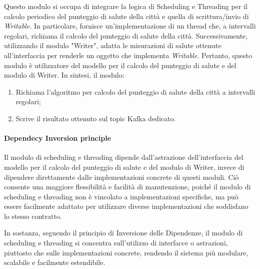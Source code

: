 Questo modulo si occupa di integrare la logica di Scheduling e Threading per il calcolo periodico del punteggio di salute della città e quella di scrittura/invio di \textit{Writable}. In particolare, fornisce un'implementazione di un thread che, a intervalli regolari, richiama il calcolo del punteggio di salute della città. Successivamente, utilizzando il modulo "Writer", adatta le misurazioni di salute ottenute all'interfaccia per renderle un oggetto che implementa \textit{Writable}. Pertanto, questo modulo è utilizzatore del modello per il calcolo del punteggio di salute e del modulo di Writer.
In sintesi, il modulo:
    \begin{enumerate}
        \item Richiama l'algoritmo per calcolo del punteggio di salute della città a intervalli regolari;
        \item Scrive il risultato ottenuto sul topic Kafka dedicato.
    \end{enumerate}

\paragraph*{Dependecy Inversion principle}
Il modulo di scheduling e threading dipende dall'astrazione dell'interfaccia del modello per il calcolo del punteggio di salute e del modulo di Writer, invece di dipendere direttamente dalle implementazioni concrete di questi moduli. Ciò consente una maggiore flessibilità e facilità di manutenzione, poiché il modulo di scheduling e threading non è vincolato a implementazioni specifiche, ma può essere facilmente adattato per utilizzare diverse implementazioni che soddisfano lo stesso contratto.

In sostanza, seguendo il principio di Inversione delle Dipendenze, il modulo di scheduling e threading si concentra sull'utilizzo di interfacce o astrazioni, piuttosto che sulle implementazioni concrete, rendendo il sistema più modulare, scalabile e facilmente estendibile.

